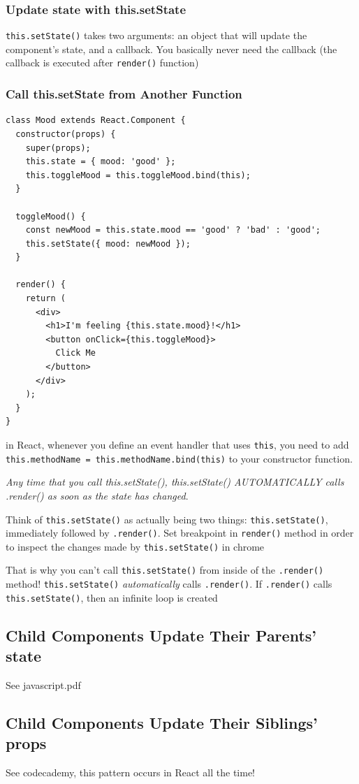 \documentclass[a4paper, 12pt]{article}
\begin{document}
\subsubsection{Update state with this.setState}
\verb|this.setState()| takes two arguments: an object that will update the component's state, and a callback. You basically never need the callback (the callback is executed after \verb|render()| function)

\subsubsection{Call this.setState from Another Function}
\begin{verbatim}
class Mood extends React.Component {
  constructor(props) {
    super(props);
    this.state = { mood: 'good' };
    this.toggleMood = this.toggleMood.bind(this);
  }

  toggleMood() {
    const newMood = this.state.mood == 'good' ? 'bad' : 'good';
    this.setState({ mood: newMood });
  }

  render() {
    return (
      <div>
        <h1>I'm feeling {this.state.mood}!</h1>
        <button onClick={this.toggleMood}>
          Click Me
        </button>
      </div>
    );
  }
}
\end{verbatim}
in React, whenever you define an event handler that uses \verb|this|, you need to add \verb|this.methodName = this.methodName.bind(this)| to your constructor function.

\textit{Any time that you call this.setState(), this.setState() AUTOMATICALLY calls .render() as soon as the state has changed}.

Think of \verb|this.setState()| as actually being two things: \verb|this.setState()|, immediately followed by \verb|.render()|. Set breakpoint in \verb|render()| method in order to inspect the changes made by \verb|this.setState()| in chrome

That is why you can't call \verb|this.setState()| from inside of the \verb|.render()| method! \verb|this.setState()| \textit{automatically} calls \verb|.render()|. If \verb|.render()| calls \verb|this.setState()|, then an infinite loop is created

\subsection{Child Components Update Their Parents' state}
See javascript.pdf

\subsection{Child Components Update Their Siblings' props}
See codecademy, this pattern occurs in React all the time!
\end{document}

